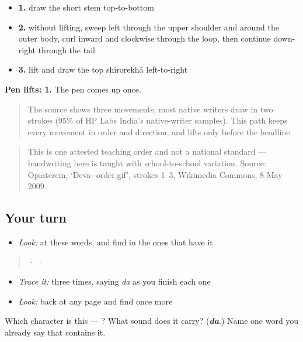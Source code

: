 \begin{itemize}
\raggedright
  \item \textbf{1.} draw the short stem top-to-bottom
  \item \textbf{2.} without lifting, sweep left through the upper shoulder and around the outer body, curl inward and clockwise through the loop, then continue down-right through the tail
  \item \textbf{3.} lift and draw the top shirorekhā left-to-right
\end{itemize}

\textbf{Pen lifts: 1.} The pen comes up once.

\begin{quote}
The source shows three movements; most native writers draw  in two strokes (95\% of HP Labs India's native-writer samples). This path keeps every movement in order and direction, and lifts only before the headline.
\end{quote}

\begin{quote}
This is one attested teaching order and not a national standard — handwriting here is taught with school-to-school variation. Source: Opiaterein, ‘Deva--order.gif’, strokes 1–3, Wikimedia Commons, 8 May 2009.
\end{quote}

\subsection*{Your turn}
\begin{itemize}
\raggedright
  \item \emph{Look:} at these words, and find  in the ones that have it
\end{itemize}

\begin{quote}
  ·    ·  
\end{quote}

\begin{itemize}
\raggedright
  \item \emph{Trace it:}  three times, saying \emph{da} as you finish each one
  \item \emph{Look:} back at any page and find  once more
\end{itemize}

\begin{tcolorbox}[breakable,colback=teal!4,colframe=teal!35!black,title={Before you move on}]
Which character is this — ? What sound does it carry? (\emph{\textbf{da}}.) Name one word you already say that contains it.
\end{tcolorbox}
